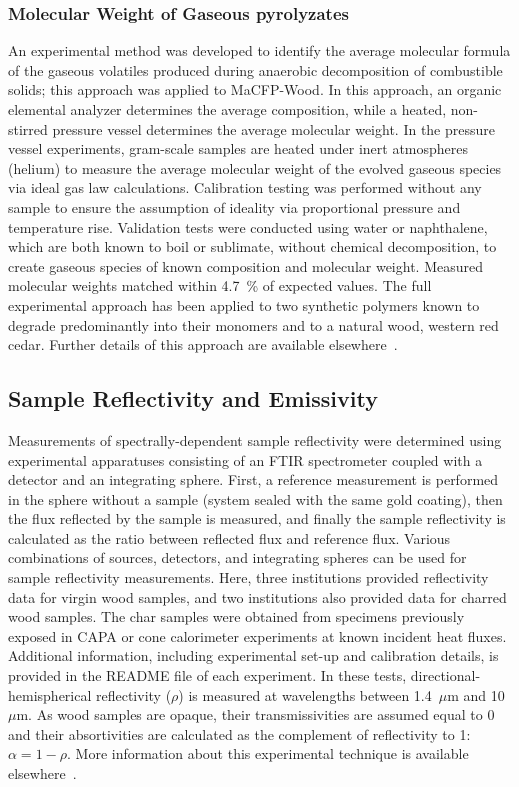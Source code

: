 \documentclass{book}
\begin{document}
\subsubsection{Molecular Weight of Gaseous pyrolyzates}
An experimental method was developed to identify the average molecular formula of the gaseous volatiles produced during anaerobic decomposition of combustible solids; this approach was applied to MaCFP-Wood. In this approach, an organic elemental analyzer determines the average composition, while a heated, non-stirred pressure vessel determines the average molecular weight. In the pressure vessel experiments, gram-scale samples are heated under inert atmospheres (helium) to measure the average molecular weight of the evolved gaseous species via ideal gas law calculations. Calibration testing was performed without any sample to ensure the assumption of ideality via proportional pressure and temperature rise. Validation tests were conducted using water or naphthalene, which are both known to boil or sublimate, without chemical decomposition, to create gaseous species of known composition and molecular weight. Measured molecular weights matched within 4.7~\% of expected values. The full experimental approach has been applied to two synthetic polymers known to degrade predominantly into their monomers and to a natural wood, western red cedar. Further details of this approach are available elsewhere~\cite{tripi2025measurement}.

\subsection{Sample Reflectivity and Emissivity}
\label{optical_tests}
Measurements of spectrally-dependent sample reflectivity were determined using experimental apparatuses consisting of an FTIR spectrometer coupled with a detector and an integrating sphere. First, a reference measurement is performed in the sphere without a sample (system sealed with the same gold coating), then the flux reflected by the sample is measured, and finally the sample reflectivity is calculated as the ratio between reflected flux and reference flux. Various combinations of sources, detectors, and integrating spheres can be used for sample reflectivity measurements. Here, three institutions provided reflectivity data for virgin wood samples, and two institutions also provided data for charred wood samples. The char samples were obtained from specimens previously exposed in CAPA or cone calorimeter experiments at known incident heat fluxes. Additional information, including experimental set-up and calibration details, is provided in the README file of each experiment.  In these tests, directional-hemispherical reflectivity ($\rho$) is measured at wavelengths between 1.4~$\mu$m and 10~$\mu$m. As wood samples are opaque, their transmissivities are assumed equal to 0 and their absortivities are calculated as the complement of reflectivity to 1: $\alpha=1-\rho$. More information about this experimental technique is available elsewhere~\cite{boulet2012characterization}.
\end{document}
